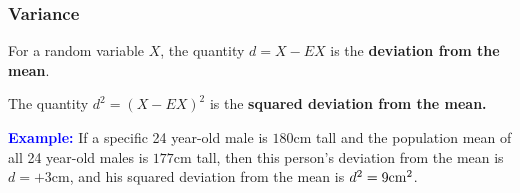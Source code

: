 %
%
%
%
%
%
%
%
%
%
%
%
%
%
%
%

\begin{frame}
\frametitle{Variance}

For a random variable $X$, the quantity $d = X-EX$ is the {\bf
  deviation from the mean}.

The quantity $d^2 = (X-EX)^2$ is the {\bf squared deviation from the
  mean.}

\textcolor{blue}{\bf Example:} If a specific 24 year-old male is
$180$cm tall and the population mean of all 24 year-old males is
$177$cm tall, then this person's deviation from the mean is $d=+3$cm,
and his squared deviation from the mean is $d^2=9{\rm
  cm}^2$.

\end{frame}


